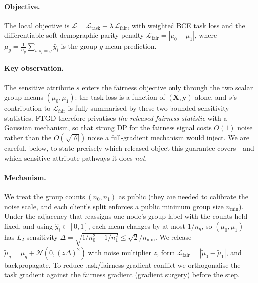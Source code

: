 \documentclass[pdflatex,sn-mathphys-num]{sn-jnl}
\theoremstyle{thmstyleone}%
\theoremstyle{thmstyletwo}%
\theoremstyle{thmstylethree}%
\begin{document}
\paragraph{Objective.}
The local objective is $\mathcal{L}=\mathcal{L}_{\text{task}}+\lambda\,
\mathcal{L}_{\text{fair}}$, with weighted BCE task loss and the differentiable
soft demographic-parity penalty
$\mathcal{L}_{\text{fair}}=|\mu_0-\mu_1|$, where
$\mu_g=\frac{1}{n_g}\sum_{i:s_i=g}\hat{y}_i$ is the group-$g$ mean prediction.

\paragraph{Key observation.}
The sensitive attribute $s$ enters the fairness objective only through the two
scalar group means $(\mu_0,\mu_1)$: the task loss is a function of
$(\mathbf{X},\mathbf{y})$ alone, and $s$'s contribution to
$\mathcal{L}_{\text{fair}}$ is fully summarised by these two bounded-sensitivity
statistics. FTGD therefore privatises \emph{the released fairness statistic}
with a Gaussian mechanism, so that strong DP for the fairness signal costs
$O(1)$ noise rather than the $O(\sqrt{|\theta|})$ noise a full-gradient
mechanism would inject. We are careful, below, to state precisely which released
object this guarantee covers---and which sensitive-attribute pathways it does
\emph{not}.

\paragraph{Mechanism.}
We treat the group counts $(n_0,n_1)$ as public (they are needed to calibrate
the noise scale, and each client's split enforces a public minimum group size
$n_{\min}$). Under the adjacency that reassigns one node's group label with the
counts held fixed, and using $\hat y_i\in[0,1]$, each mean changes by at most
$1/n_g$, so $(\mu_0,\mu_1)$ has $L_2$ sensitivity
$\Delta=\sqrt{1/n_0^2+1/n_1^2}\le\sqrt{2}/n_{\min}$. We release
$\tilde{\mu}_g=\mu_g+\mathcal{N}(0,(z\Delta)^2)$ with noise multiplier $z$, form
$\mathcal{L}_{\text{fair}}=|\tilde{\mu}_0-\tilde{\mu}_1|$, and backpropagate.
To reduce task/fairness gradient conflict we orthogonalise the task gradient
against the fairness gradient (gradient surgery) before the step.
\end{document}
